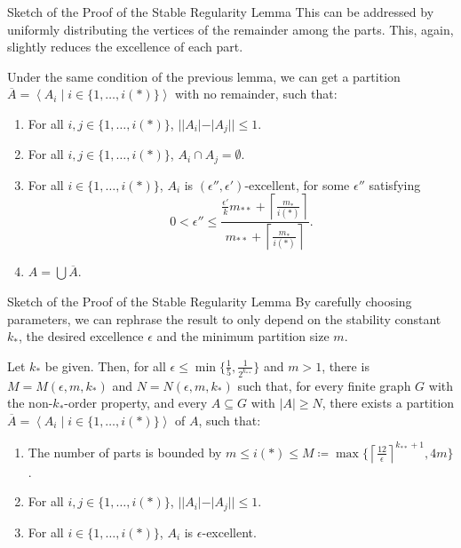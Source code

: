 \documentclass{beamer}
\newcommand{\parcurly}[1]{\{ #1 \}}
\newcommand{\parround}[1]{( #1 )}
\newcommand{\parstraight}[1]{| #1 |}
\newcommand{\Partriangle}[1]{\left< #1 \right>}
\newcommand{\ceil}[1]{\left\lceil #1 \right\rceil}
\begin{document}
\begin{frame}{Sketch of the Proof of the Stable Regularity Lemma}
    This can be addressed by uniformly distributing the vertices of the remainder among the parts.
    This, again, slightly reduces the excellence of each part.
    \begin{lemma}
        Under the same condition of the previous lemma, we can get a
        partition $\overline{A} = \Partriangle{A_i \mid i \in \parcurly{1, \dots, i(*)}}$ with no remainder, such that:
        \begin{enumerate}
            \item For all $i, j \in \parcurly{1, \dots, i(*)}$, $\parstraight{\parstraight{A_i}- \parstraight{A_j}} \leq 1$.
            \item For all $i, j \in \parcurly{1, \dots, i(*)}$, $A_i \cap A_j = \emptyset$.
            \item For all $i \in \parcurly{1, \dots, i(*)}$, $A_i$ is $\parround{\epsilon'', \epsilon'}$-excellent, for some $\epsilon''$
                satisfying
                \[
                    0 < \epsilon'' \leq \frac{\frac{\epsilon'}{k} m_{**} + \ceil{\frac{m_*}{i(*)}}}{m_{**} + \ceil{\frac{m_*}{i(*)}}}.
                \]
            \item $A = \bigcup \overline{A}$.
        \end{enumerate}
    \end{lemma}
\end{frame}

\begin{frame}{Sketch of the Proof of the Stable Regularity Lemma}
    By carefully choosing parameters, we can rephrase the result to only depend on the stability constant $k_*$,
    the desired excellence $\epsilon$ and the minimum partition size $m$.
    \begin{theorem}
        Let $k_*$ be given.
        Then, for all $\epsilon \leq \min \parcurly{\frac{1}{5}, \frac{1}{2^{k_{**}}}}$ and $m > 1$, there is $M = M\parround{\epsilon, m, k_*}$
        and $N = N\parround{\epsilon, m, k_*}$ such that, for every finite graph $G$ with the non-$k_{*}$-order property, and
        every $A \subseteq G$ with $|A| \geq N$, there exists a partition $\overline{A} = \Partriangle{A_i \mid i \in \parcurly{1, \dots, i(*)}}$
        of $A$, such that:
        \begin{enumerate}
            \item The number of parts is bounded by
                $m \leq i(*) \leq M \coloneqq \max \parcurly{\ceil{\frac{12}{\epsilon}}^{k_{**}+1}, 4m}$.
            \item For all $i, j \in \parcurly{1, \dots, i(*)}$, $\parstraight{\parstraight{A_i}- \parstraight{A_j}} \leq 1$.
            \item For all $i \in \parcurly{1, \dots, i(*)}$, $A_i$ is $\epsilon$-excellent.
        \end{enumerate}
    \end{theorem}
\end{frame}
\end{document}
